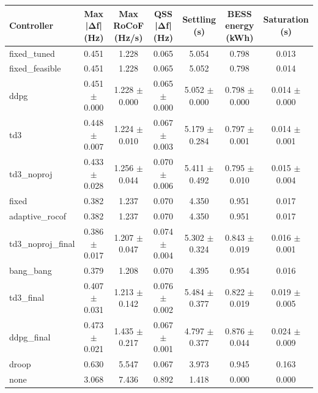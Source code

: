 \begin{tabular}{lcccccc}
\toprule
Controller & Max |Δf| (Hz) & Max RoCoF (Hz/s) & QSS |Δf| (Hz) & Settling (s) & BESS energy (kWh) & Saturation (s) \\
\midrule
fixed\_tuned & 0.451 & 1.228 & 0.065 & 5.054 & 0.798 & 0.013 \\
fixed\_feasible & 0.451 & 1.228 & 0.065 & 5.052 & 0.798 & 0.014 \\
ddpg & 0.451 $\pm$ 0.000 & 1.228 $\pm$ 0.000 & 0.065 $\pm$ 0.000 & 5.052 $\pm$ 0.000 & 0.798 $\pm$ 0.000 & 0.014 $\pm$ 0.000 \\
td3 & 0.448 $\pm$ 0.007 & 1.224 $\pm$ 0.010 & 0.067 $\pm$ 0.003 & 5.179 $\pm$ 0.284 & 0.797 $\pm$ 0.001 & 0.014 $\pm$ 0.001 \\
td3\_noproj & 0.433 $\pm$ 0.028 & 1.256 $\pm$ 0.044 & 0.070 $\pm$ 0.006 & 5.411 $\pm$ 0.492 & 0.795 $\pm$ 0.010 & 0.015 $\pm$ 0.004 \\
fixed & 0.382 & 1.237 & 0.070 & 4.350 & 0.951 & 0.017 \\
adaptive\_rocof & 0.382 & 1.237 & 0.070 & 4.350 & 0.951 & 0.017 \\
td3\_noproj\_final & 0.386 $\pm$ 0.017 & 1.207 $\pm$ 0.047 & 0.074 $\pm$ 0.004 & 5.302 $\pm$ 0.324 & 0.843 $\pm$ 0.019 & 0.016 $\pm$ 0.001 \\
bang\_bang & 0.379 & 1.208 & 0.070 & 4.395 & 0.954 & 0.016 \\
td3\_final & 0.407 $\pm$ 0.031 & 1.213 $\pm$ 0.142 & 0.076 $\pm$ 0.002 & 5.484 $\pm$ 0.377 & 0.822 $\pm$ 0.019 & 0.019 $\pm$ 0.005 \\
ddpg\_final & 0.473 $\pm$ 0.021 & 1.435 $\pm$ 0.217 & 0.067 $\pm$ 0.001 & 4.797 $\pm$ 0.377 & 0.876 $\pm$ 0.044 & 0.024 $\pm$ 0.009 \\
droop & 0.630 & 5.547 & 0.067 & 3.973 & 0.945 & 0.163 \\
none & 3.068 & 7.436 & 0.892 & 1.418 & 0.000 & 0.000 \\
\bottomrule
\end{tabular}